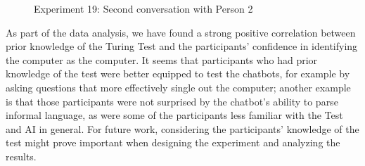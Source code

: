 \begin{figure}[ht]
   \begin{center}
   \end{center}
   \caption{Experiment 19: Second conversation with Person 2}
   \label{convex3}
\end{figure}

As part of the data analysis, we have found a strong positive correlation between prior knowledge of the Turing Test and the participants' confidence in identifying the computer as the computer. It seems that participants who had prior knowledge of the test were better equipped to test the chatbots, for example by asking questions that more effectively single out the computer; another example is that those participants were not surprised by the chatbot's ability to parse informal language, as were some of the participants less familiar with the Test and AI in general. For future work, considering the participants' knowledge of the test might prove important when designing the experiment and analyzing the results.

